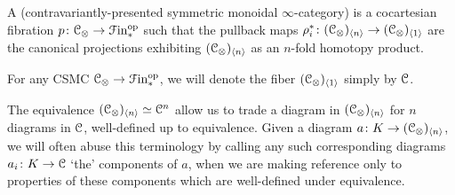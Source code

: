 \documentclass[main.tex]{subfiles}
\begin{document}
\begin{definition}
  A  (contravariantly-presented symmetric monoidal $\infty$-category) is a cocartesian fibration $p\colon \mathcal{C}_{\otimes} \to \mathcal{F}\mathrm{in}_{*}^{\mathrm{op}}$ such that the pullback maps $\rho_{i}^{*}\colon (\mathcal{C}_{ \otimes})_{\langle n \rangle} \to (\mathcal{C}_{ \otimes})_{\langle 1 \rangle}$ are the canonical projections exhibiting $(\mathcal{C}_{ \otimes})_{\langle n \rangle}$ as an $n$-fold homotopy product.
\end{definition}

\begin{notation}
  For any CSMC $\mathcal{C}_{\otimes} \to \mathcal{F}\mathrm{in}_{*}^{\mathrm{op}}$, we will denote the fiber $(\mathcal{C}_{\otimes})_{\langle 1 \rangle}$ simply by $\mathcal{C}$.
\end{notation}

The equivalence $(\mathcal{C}_{\otimes})_{\langle n \rangle} \simeq \mathcal{C}^{n}$ allow us to trade a diagram in $(\mathcal{C}_{\otimes})_{\langle n \rangle}$ for $n$ diagrams in $\mathcal{C}$, well-defined up to equivalence. Given a diagram $a\colon K \to (\mathcal{C}_{\otimes})_{\langle n \rangle}$, we will often abuse this terminology by calling any such corresponding diagrams $a_{i}\colon K \to \mathcal{C}$ `the' components of $a$, when we are making reference only to properties of these components which are well-defined under equivalence.
\end{document}
